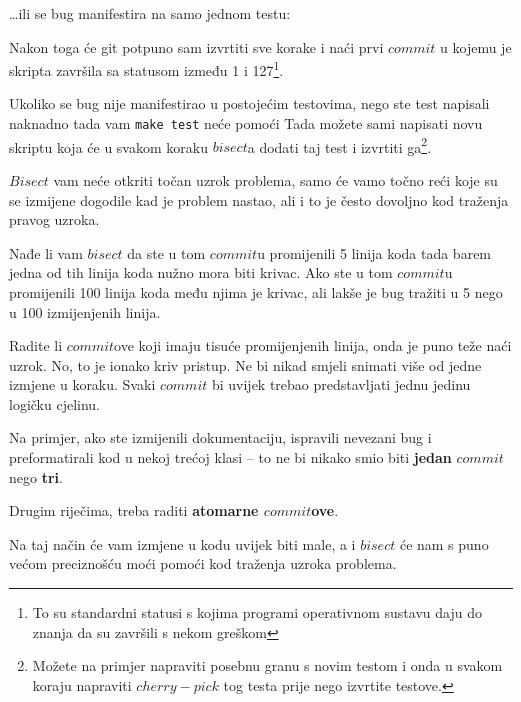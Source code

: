 \dots{}ili se bug manifestira na samo jednom testu:


Nakon toga će git potpuno sam izvrtiti sve korake i naći prvi $commit$ u kojemu je skripta završila sa statusom između 1 i 127\footnote{To su standardni statusi s kojima programi operativnom sustavu daju do znanja da su završili s nekom greškom}.

Ukoliko se bug nije manifestirao u postojećim testovima, nego ste test napisali naknadno tada vam \verb+make test+ neće pomoći
Tada možete sami napisati novu skriptu koja će u svakom koraku $bisect$a dodati taj test i izvrtiti ga\footnote{Možete na primjer napraviti posebnu granu s novim testom i onda u svakom koraju napraviti $cherry-pick$ tog testa prije nego izvrtite testove.}.


$Bisect$ vam neće otkriti točan uzrok problema, samo će vamo točno reći koje su se izmijene dogodile kad je problem nastao, ali i to je često dovoljno kod traženja pravog uzroka. 

Nađe li vam $bisect$ da ste u tom $commit$u promijenili 5 linija koda tada barem jedna od tih linija koda nužno mora biti krivac.
Ako ste u tom $commit$u promijenili 100 linija koda među njima je krivac, ali lakše je bug tražiti u 5 nego u 100 izmijenjenih linija.

Radite li $commit$ove koji imaju tisuće promijenjenih linija, onda je puno teže naći uzrok.
No, to je ionako kriv pristup.
Ne bi nikad smjeli snimati više od jedne izmjene u koraku.
Svaki $commit$ bi uvijek trebao predstavljati jednu jedinu logičku cjelinu.

Na primjer, ako ste izmijenili dokumentaciju, ispravili nevezani bug i preformatirali kod u nekoj trećoj klasi -- to ne bi nikako smio biti \textbf{jedan} $commit$ nego \textbf{tri}.

Drugim riječima, treba raditi \textbf{atomarne $commit$ove}.

Na taj način će vam izmjene u kodu uvijek biti male, a i $bisect$ će nam s puno većom preciznošću moći pomoći kod traženja uzroka problema.
